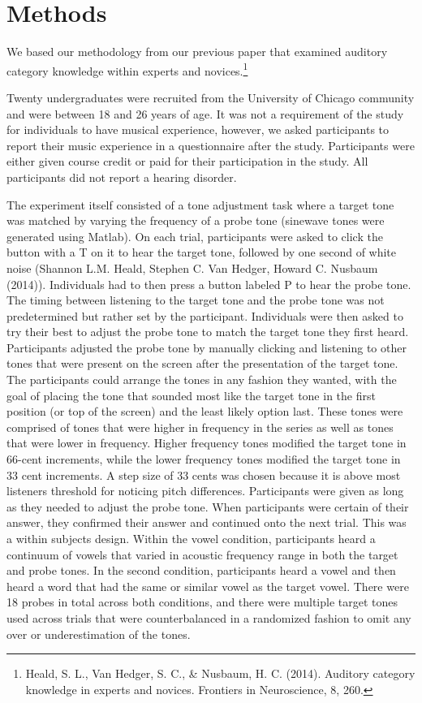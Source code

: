\documentclass[
  man]{apa6}
\begin{document}
\hypertarget{methods}{%
\section{Methods}\label{methods}}

We based our methodology from our previous paper that examined auditory category knowledge within experts and novices.\footnote{Heald, S. L., Van Hedger, S. C., \& Nusbaum, H. C. (2014). Auditory category knowledge in experts and novices. Frontiers in Neuroscience, 8, 260.}

Twenty undergraduates were recruited from the University of Chicago community and were between 18 and 26 years of age. It was not a requirement of the study for individuals to have musical experience, however, we asked participants to report their music experience in a questionnaire after the study. Participants were either given course credit or paid for their participation in the study. All participants did not report a hearing disorder.

The experiment itself consisted of a tone adjustment task where a target tone was matched by varying the frequency of a probe tone (sinewave tones were generated using Matlab). On each trial, participants were asked to click the button with a T on it to hear the target tone, followed by one second of white noise (Shannon L.M. Heald, Stephen C. Van Hedger, Howard C. Nusbaum (2014)). Individuals had to then press a button labeled P to hear the probe tone. The timing between listening to the target tone and the probe tone was not predetermined but rather set by the participant. Individuals were then asked to try their best to adjust the probe tone to match the target tone they first heard. Participants adjusted the probe tone by manually clicking and listening to other tones that were present on the screen after the presentation of the target tone. The participants could arrange the tones in any fashion they wanted, with the goal of placing the tone that sounded most like the target tone in the first position (or top of the screen) and the least likely option last. These tones were comprised of tones that were higher in frequency in the series as well as tones that were lower in frequency. Higher frequency tones modified the target tone in 66-cent increments, while the lower frequency tones modified the target tone in 33 cent increments. A step size of 33 cents was chosen because it is above most listeners threshold for noticing pitch differences. Participants were given as long as they needed to adjust the probe tone. When participants were certain of their answer, they confirmed their answer and continued onto the next trial. This was a within subjects design. Within the vowel condition, participants heard a continuum of vowels that varied in acoustic frequency range in both the target and probe tones. In the second condition, participants heard a vowel and then heard a word that had the same or similar vowel as the target vowel. There were 18 probes in total across both conditions, and there were multiple target tones used across trials that were counterbalanced in a randomized fashion to omit any over or underestimation of the tones.
\end{document}
